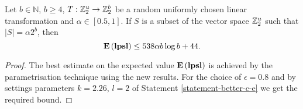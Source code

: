 \begin{corollary}
\label{corollary-best-elpsl}
Let $b \in \mathbb{N}$, $b \geq 4$, $T: \mathbb{Z}_{2}^{u} \rightarrow \mathbb{Z}_{2}^{b}$ be a random uniformly chosen linear transformation and $\alpha \in \left[0.5, 1\right]$. If $S$ is a subset of the vector space $\mathbb{Z}_{2}^{u}$ such that $|S| = \alpha 2 ^ b$, then \[ \mathbf{E}\left(\mathbf{lpsl}\right) \leq 538 \alpha b \log b + 44 \text{.} \] 
\end{corollary}
\begin{proof}
The best estimate on the expected value $\mathbf{E}\left(\mathbf{lpsl}\right)$ is achieved by the parametrisation technique using the new results. For the choice of $\epsilon = 0.8$ and by settings parameters $k = 2.26$, $l = 2$ of Statement \ref{statement-better-c-e} we get the required bound.
\end{proof}
